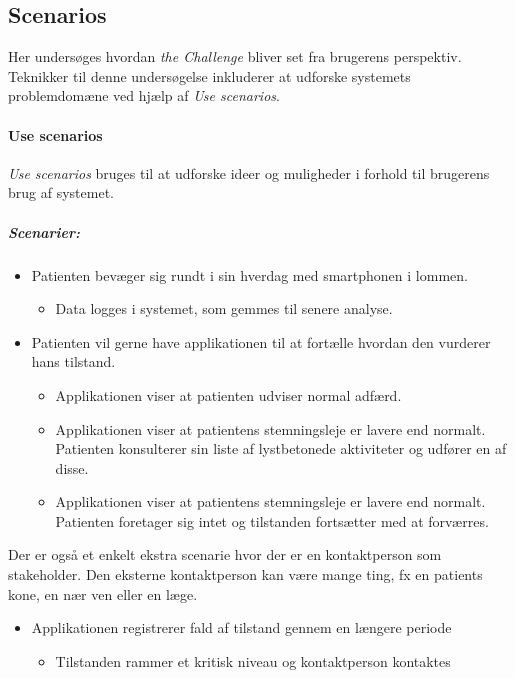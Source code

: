 \subsection{Scenarios}
Her undersøges hvordan \textit{the Challenge} bliver set fra brugerens perspektiv.
Teknikker til denne undersøgelse inkluderer at udforske systemets problemdomæne ved hjælp af \textit{Use scenarios}.

\paragraph{Use scenarios}
\textit{Use scenarios} bruges til at udforske ideer og muligheder i forhold til brugerens brug af systemet.

\subparagraph{Scenarier:}
\begin{itemize}
	\item Patienten bevæger sig rundt i sin hverdag med smartphonen i lommen. 
	\begin{itemize}
		\item Data logges i systemet, som gemmes til senere analyse.
	\end{itemize}
	
	\item Patienten vil gerne have applikationen til at fortælle hvordan den vurderer hans tilstand.
	\begin{itemize}
		\item Applikationen viser at patienten udviser normal adfærd.
		\item Applikationen viser at patientens stemningsleje er lavere end normalt.
		Patienten konsulterer sin liste af lystbetonede aktiviteter og udfører en af disse.
		\item Applikationen viser at patientens stemningsleje er lavere end normalt.
		Patienten foretager sig intet og tilstanden fortsætter med at forværres.
	\end{itemize}
\end{itemize}
Der er også et enkelt ekstra scenarie hvor der er en kontaktperson som stakeholder.
Den eksterne kontaktperson kan være mange ting, fx en patients kone, en nær ven eller en læge.
\begin{itemize}
	\item Applikationen registrerer fald af tilstand gennem en længere periode
	\begin{itemize}
		\item Tilstanden rammer et kritisk niveau og kontaktperson kontaktes
	\end{itemize}
\end{itemize}


